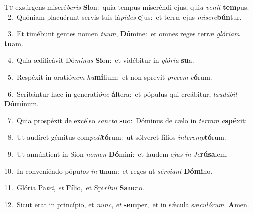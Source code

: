 \lettrine{\initial\textcolor{\initialcolor}{T}}{u} exsúrgens miseré\-\textit{be}\-\textit{ris} \textbf{Si}\-on:~\star quia tempus miseréndi ejus, qui\textit{a} \textit{ve}\-\textit{nit} \textbf{tem}\-pus.\\
{\numbfont\textcolor{\numbcolor}{~2.}}~Quóniam placuérunt servis tuis lá\-\textit{pi}\-\textit{des} \textbf{e}\-jus:~\star et terræ ejus \textit{mi}\-\textit{se}\textit{re}\textbf{bún}tur.\par
{\numbfont\textcolor{\numbcolor}{~3.}}~Et timébunt gentes nomen \textit{tu}\-\textit{um}, \textbf{Dó}\-mine:~\star et omnes reges terræ \textit{gló}\-\textit{ri}\textit{am} \textbf{tu}\-am.\par
{\numbfont\textcolor{\numbcolor}{~4.}}~Quia ædificávit Dó\-\textit{mi}\-\textit{nus} \textbf{Si}\-on:~\star et vidébitur in \textit{gló}\-\textit{ri}\textit{a} \textbf{su}\-a.\par
{\numbfont\textcolor{\numbcolor}{~5.}}~Respéxit in oratió\textit{nem} \textit{hu}\-\textbf{mí}lium:~\star et non sprevit \textit{pre}\-\textit{cem} \textit{e}\-\textbf{ó}rum.\par
{\numbfont\textcolor{\numbcolor}{~6.}}~Scribántur hæc in generati\-\textit{ó}\-\textit{ne} \textbf{ál}\-tera:~\star et pópulus qui creábitur, \textit{lau}\-\textit{dá}\textit{bit} \textbf{Dó}\-\textbf{mi}num.\par
{\numbfont\textcolor{\numbcolor}{~7.}}~Quia prospéxit de excélso \textit{sanc}\-\textit{to} \textbf{su}\-o:~\star Dóminus de cælo in \textit{ter}\-\textit{ram} \textit{a}\-\textbf{spé}xit:\par
{\numbfont\textcolor{\numbcolor}{~8.}}~Ut audíret gémitus com\-\textit{pe}\-\textit{di}\textbf{tó}rum:~\star ut sólveret fílios \textit{in}\-\textit{ter}\textit{emp}\textbf{tó}rum.\par
{\numbfont\textcolor{\numbcolor}{~9.}}~Ut annúntient in Sion \textit{no}\-\textit{men} \textbf{Dó}\-mini:~\star et laudem e\textit{jus} \textit{in} \textit{Je}\-\textbf{rú}\textbf{sa}lem.\par
{\numbfont\textcolor{\numbcolor}{10.}}~In conveniéndo pópu\textit{los} \textit{in} \textbf{u}\-num:~\star et reges ut \textit{sér}\-\textit{vi}\textit{ant} \textbf{Dó}\-\textbf{mi}no.\par
{\numbfont\textcolor{\numbcolor}{11.}}~Glória Pa\-\textit{tri}\-, \textit{et} \textbf{Fí}\-lio,~\star et Spi\-\textit{rí}\-\textit{tu}\textit{i} \textbf{Sanc}\-to.\par
{\numbfont\textcolor{\numbcolor}{12.}}~Sicut erat in princípio, et \textit{nunc}\-, \textit{et} \textbf{sem}\-per,~\star et in sǽcula sæ\-\textit{cu}\-\textit{ló}\textit{rum}. \textbf{A}\-men.\par
